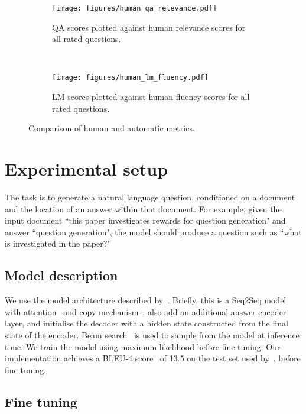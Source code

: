 \documentclass[11pt,a4paper]{article}
\begin{document}
\begin{figure*}[ht]
\centering
    \begin{subfigure}[t]{0.49\textwidth}
        \centering
        \texttt{[image: figures/human\_qa\_relevance.pdf]}
        \caption{QA scores plotted against human relevance scores for all rated questions.}
    \end{subfigure}~
    \begin{subfigure}[t]{0.49\textwidth}
        \centering
        \texttt{[image: figures/human\_lm\_fluency.pdf]}
        \caption{LM scores plotted against human fluency scores for all rated questions.}
    \end{subfigure}
\caption{Comparison of human and automatic metrics.}
\label{fig:human_qa_rel}
\end{figure*}

\section{Experimental setup}

The task is to generate a natural language question, conditioned on a document and the location of an answer within that document. For example, given the input document ``this paper investigates rewards for question generation" and answer ``question generation", the model should produce a question such as ``what is investigated in the paper?"

\subsection{Model description}

We use the model architecture described by~\citet{Maluuba}. Briefly, this is a Seq2Seq model~\cite{Sutskever2014} with attention~\cite{Bahdanau2014} and copy mechanism~\citep{Vinyals2015, Gulcehre2016}. \citet{Maluuba} also add an additional answer encoder layer, and initialise the decoder with a hidden state constructed from the final state of the encoder. Beam search~\cite{BeamSearch} is used to sample from the model at inference time. We train the model using maximum likelihood before fine tuning. Our implementation achieves a BLEU-4 score~\cite{Papineni} of 13.5 on the test set used by~\citet{Du}, before fine tuning.

\subsection{Fine tuning}
\end{document}
